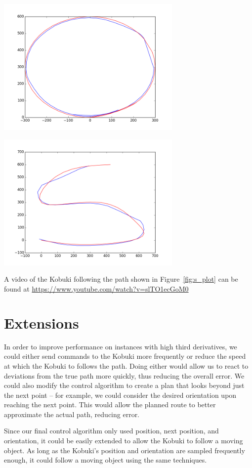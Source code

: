 \documentclass[10pt]{article}
\newenvironment{Figure}
  {\par\medskip\noindent\minipage{\linewidth}}
  {\endminipage\par\medskip}
\def\videolink{\url{https://www.youtube.com/watch?v=slTO1ecGoM0}}
\begin{document}
\begin{multicols*}{2}
  \begin{Figure}
    \includegraphics[width=9cm]{../plots/circle_plot.png}
    \label{fig:circ_plot}
  \end{Figure}

  \begin{Figure}
    \includegraphics[width=9cm]{../plots/s_plot.png}
     \label{fig:s_plot}
  \end{Figure}

  A video of the Kobuki following the path shown in Figure~\ref{fig:s_plot} can
  be found at \videolink{}

  \section*{Extensions}
  In order to improve performance on instances with high third derivatives, we
  could either send commands to the Kobuki more frequently or reduce the speed
  at which the Kobuki to follows the path. Doing either would allow us to react
  to deviations from the true path more quickly, thus reducing the overall
  error. We could also modify the control algorithm to create a plan that looks
  beyond just the next point -- for example, we could consider the desired
  orientation upon reaching the next point. This would allow the planned route
  to better approximate the actual path, reducing error.

  Since our final control algorithm only used position, next position, and
  orientation, it could be easily extended to allow the Kobuki to follow a
  moving object. As long as the Kobuki's position and orientation are sampled
  frequently enough, it could follow a moving object using the same techniques.
\end{multicols*}


\end{document}
